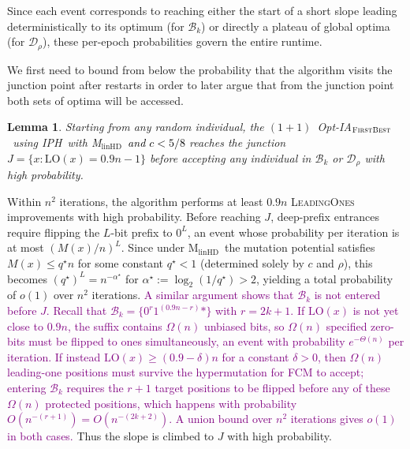 \documentclass[lettersize,journal]{IEEEtran}
\newcommand{\rerev}[1]{\textcolor{purple}{#1}}
\newcommand{\linHD}{M$_{\text{linHD}}$}
\newcommand{\IPHfcm}{IPH}
\newtheorem{lemma}{Lemma}
\begin{document}
Since each event corresponds to reaching either the start of a short slope leading deterministically to its optimum (for $\mathcal{B}_k$) or directly a plateau of global optima (for $\mathcal{D}_\rho$), these per-epoch probabilities govern the entire runtime.

We first need to bound from below the probability that the algorithm visits the junction point after restarts in order to later argue that from the junction point both sets of optima will be accessed.

\begin{lemma} \label{lem:junction-first-density-Bk}
	Starting from any random individual, the $(1+1)$~Opt-IA$_{\textsc{FirstBest}}$~using \IPHfcm{}~with \linHD~\textcolor{black}{and $c<5/8$}  reaches the junction $J = \{x : \mathrm{LO}(x)=0.9n-1\}$ before accepting any individual in $\mathcal{B}_k$ or $\mathcal{D}_\rho$ with high probability.
\end{lemma}

Within $n^2$ iterations, the algorithm performs at least $0.9n$ \textsc{LeadingOnes} 
improvements with high probability.  
Before reaching $J$, deep-prefix entrances require flipping the $L$-bit prefix 
to $0^L$, an event whose probability per iteration is at most $(M(x)/n)^L$.  
Since under \linHD\ the mutation potential satisfies $M(x) \le q^\star n$ for 
some constant $q^\star < 1$ (determined solely by $c$ and $\rho$), this becomes 
$(q^\star)^L = n^{-\alpha^\star}$ for $\alpha^\star := \log_2(1/q^\star) > 2$, 
yielding a total probability of $o(1)$ over $n^2$ iterations.
\rerev{A similar argument shows that $\mathcal{B}_k$ is not entered before $J$.
Recall that $\mathcal{B}_k = \{0^r 1^{(0.9n-r)}*\}$ with $r = 2k+1$.
If $\mathrm{LO}(x)$ is not yet close to $0.9n$, the suffix contains
$\Omega(n)$ unbiased bits, so $\Omega(n)$ specified zero-bits must be
flipped to ones simultaneously, an event with probability
$e^{-\Theta(n)}$ per iteration.
If instead $\mathrm{LO}(x) \geq (0.9-\delta)n$ for a constant $\delta > 0$,
then $\Omega(n)$ leading-one positions must survive the hypermutation
for FCM to accept; entering $\mathcal{B}_k$ requires the $r+1$ target
positions to be flipped before any of these $\Omega(n)$ protected
positions, which happens with probability $O(n^{-(r+1)}) = O(n^{-(2k+2)})$.
A union bound over $n^2$ iterations gives $o(1)$ in both cases.}
Thus the slope is climbed to $J$ with high probability.
\end{document}
